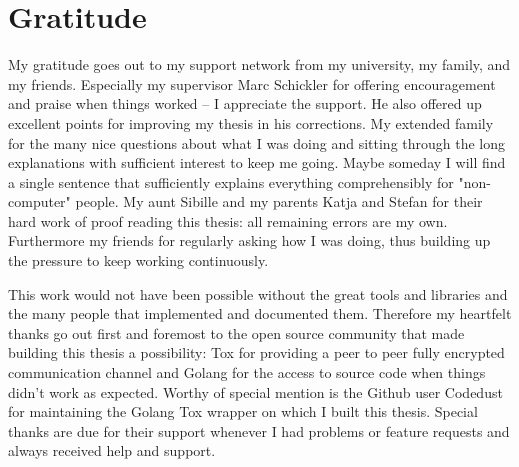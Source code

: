 \section*{Gratitude}
\label{chap:gratitude}

My gratitude goes out to my support network from my university, my family, and my friends.
Especially my supervisor Marc Schickler for offering encouragement and praise when things worked -- I appreciate the support.
He also offered up excellent points for improving my thesis in his corrections.
My extended family for the many nice questions about what I was doing and sitting through the long explanations with sufficient interest to keep me going.
Maybe someday I will find a single sentence that sufficiently explains everything comprehensibly for "non-computer" people.
My aunt Sibille and my parents Katja and Stefan for their hard work of proof reading this thesis: all remaining errors are my own.
Furthermore my friends for regularly asking how I was doing, thus building up the pressure to keep working continuously.

This work would not have been possible without the great tools and libraries and the many people that implemented and documented them.
Therefore my heartfelt thanks go out first and foremost to the open source community that made building this thesis a possibility: Tox for providing a peer to peer fully encrypted communication channel and Golang for the access to source code when things didn't work as expected.
Worthy of special mention is the Github user Codedust for maintaining the Golang Tox wrapper on which I built this thesis.
Special thanks are due for their support whenever I had problems or feature requests and always received help and support.
